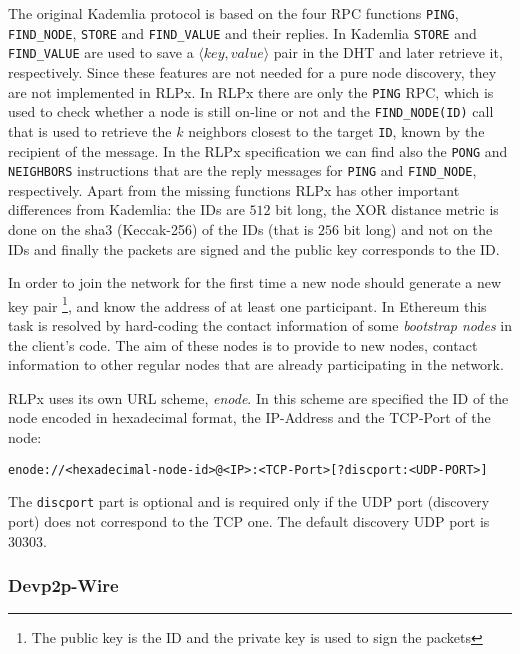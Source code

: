 The original Kademlia protocol is based on the four RPC functions
\verb|PING|, \verb|FIND_NODE|,
\verb|STORE| and \verb|FIND_VALUE| and their replies.
In Kademlia \verb|STORE| and \verb|FIND_VALUE| are used to save a
$\langle key, value\rangle$ pair in the DHT and later retrieve it, respectively.
Since these features are not needed for a pure node discovery, they
are not implemented in RLPx.
In RLPx there are only the \verb|PING| RPC, which is used to check whether a
node is still on-line or not and the \verb|FIND_NODE(ID)| call that is used to
retrieve the $k$ neighbors closest to the target \verb|ID|, known by the
recipient of the message. In the RLPx specification we can find also
the \verb|PONG| and \verb|NEIGHBORS| instructions that are the reply messages
for \verb|PING| and \verb|FIND_NODE|, respectively.
Apart from the missing functions RLPx has other important differences
from Kademlia:
the IDs are $512$ bit long, the XOR distance metric is done on the sha3
(Keccak-256) of the IDs (that is $256$ bit long) and not on the IDs and
finally the packets are signed and the public key corresponds to the ID.

In order to join the network for the first time a new node should
generate a new key pair
\footnote{The public key is the ID and the private key is used to sign the packets}, and
know the address of at least one participant.
In Ethereum this task is resolved by hard-coding the contact information
of some \textit{bootstrap nodes} in the client's code.
The aim of these nodes is to provide to new nodes, contact information to
other regular nodes that are already participating in the network.

RLPx uses its own URL scheme, \emph{enode}.
In this scheme are specified the ID of the node encoded in hexadecimal format,
the IP-Address and the TCP-Port of the node:
\begin{verbatim}
enode://<hexadecimal-node-id>@<IP>:<TCP-Port>[?discport:<UDP-PORT>]
\end{verbatim}
The \verb|discport| part is optional and is required only if the
UDP port (discovery port) does not correspond to the TCP one.
The default discovery UDP port is 30303.





\subsubsection{Devp2p-Wire}

